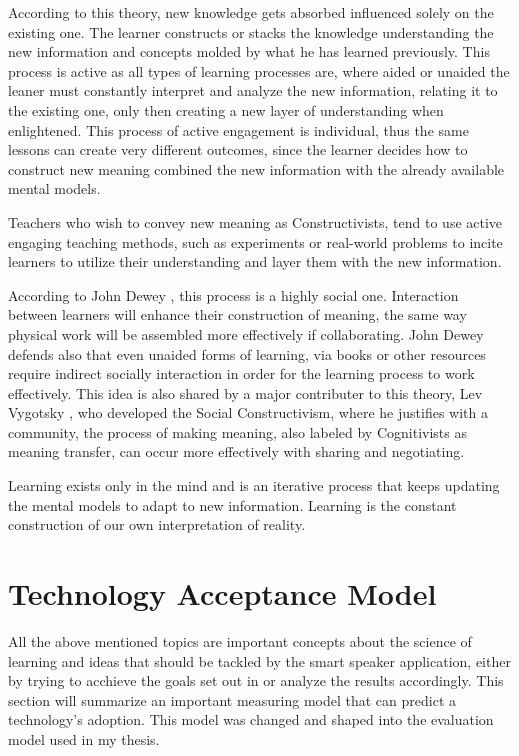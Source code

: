 According to this theory, new knowledge gets absorbed influenced solely on the 
existing one. The learner constructs or stacks the knowledge understanding the new 
information and concepts molded by what he has learned previously. This process is
active \cite{adler_1970} as all types of learning processes are, where aided or 
unaided the leaner must constantly interpret and analyze the new information,
relating it to the existing one, only then creating a new layer of understanding 
when enlightened. This process of active engagement is individual, thus the same 
lessons can create very different outcomes, since the learner decides how to construct
new meaning combined the new information with the already available mental models.

Teachers who wish to convey new meaning as Constructivists, tend to use active 
engaging teaching methods, such as experiments or real-world problems to incite
learners to utilize their understanding and layer them with the new information.

According to John Dewey \cite{dewey_1938}, this process is a highly social one. 
Interaction between learners will enhance their construction of meaning, the same
way physical work will be assembled more effectively if collaborating.
John Dewey defends also that even unaided forms of learning, via books or other 
resources require indirect socially interaction in order for the learning process 
to work effectively. This idea is also shared by a major contributer to this theory,
Lev Vygotsky \cite{vygotsky_1978}, who developed the Social Constructivism, where 
he justifies with a community, the process of making meaning, also labeled by
Cognitivists as meaning transfer, can occur more effectively with sharing and 
negotiating.

Learning exists only in the mind and is an iterative process that keeps updating the
mental models to adapt to new information. Learning is the constant construction 
of our own interpretation of reality.


\section{Technology Acceptance Model}
\label{section:tam}


All the above mentioned topics are important concepts about the science of learning
and ideas that should be tackled by the smart speaker application, either by 
trying to acchieve the goals set out in  or analyze
the results accordingly. This section 
will summarize an important measuring model that can predict a technology's adoption.
This model was changed and shaped into the evaluation model used in my thesis.

